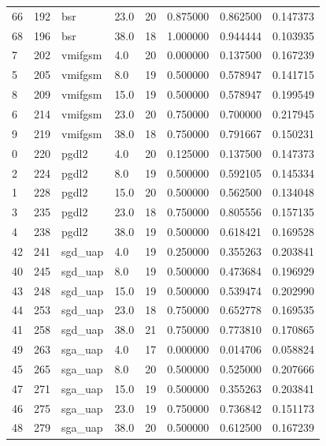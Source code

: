 \begin{tabular}{lrllrrrr}
66 & 192 & bsr & 23.0 & 20 & 0.875000 & 0.862500 & 0.147373 \\
68 & 196 & bsr & 38.0 & 18 & 1.000000 & 0.944444 & 0.103935 \\
7 & 202 & vmifgsm & 4.0 & 20 & 0.000000 & 0.137500 & 0.167239 \\
5 & 205 & vmifgsm & 8.0 & 19 & 0.500000 & 0.578947 & 0.141715 \\
8 & 209 & vmifgsm & 15.0 & 19 & 0.500000 & 0.578947 & 0.199549 \\
6 & 214 & vmifgsm & 23.0 & 20 & 0.750000 & 0.700000 & 0.217945 \\
9 & 219 & vmifgsm & 38.0 & 18 & 0.750000 & 0.791667 & 0.150231 \\
0 & 220 & pgdl2 & 4.0 & 20 & 0.125000 & 0.137500 & 0.147373 \\
2 & 224 & pgdl2 & 8.0 & 19 & 0.500000 & 0.592105 & 0.145334 \\
1 & 228 & pgdl2 & 15.0 & 20 & 0.500000 & 0.562500 & 0.134048 \\
3 & 235 & pgdl2 & 23.0 & 18 & 0.750000 & 0.805556 & 0.157135 \\
4 & 238 & pgdl2 & 38.0 & 19 & 0.500000 & 0.618421 & 0.169528 \\
42 & 241 & sgd_uap & 4.0 & 19 & 0.250000 & 0.355263 & 0.203841 \\
40 & 245 & sgd_uap & 8.0 & 19 & 0.500000 & 0.473684 & 0.196929 \\
43 & 248 & sgd_uap & 15.0 & 19 & 0.500000 & 0.539474 & 0.202990 \\
44 & 253 & sgd_uap & 23.0 & 18 & 0.750000 & 0.652778 & 0.169535 \\
41 & 258 & sgd_uap & 38.0 & 21 & 0.750000 & 0.773810 & 0.170865 \\
49 & 263 & sga_uap & 4.0 & 17 & 0.000000 & 0.014706 & 0.058824 \\
45 & 265 & sga_uap & 8.0 & 20 & 0.500000 & 0.525000 & 0.207666 \\
47 & 271 & sga_uap & 15.0 & 19 & 0.500000 & 0.355263 & 0.203841 \\
46 & 275 & sga_uap & 23.0 & 19 & 0.750000 & 0.736842 & 0.151173 \\
48 & 279 & sga_uap & 38.0 & 20 & 0.500000 & 0.612500 & 0.167239 \\
\bottomrule
\end{tabular}
